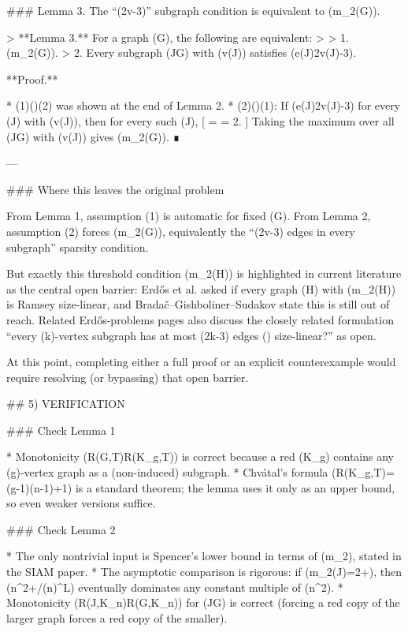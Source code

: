 ### Lemma 3. The “(2v-3)” subgraph condition is equivalent to (m_2(G)).

> **Lemma 3.** For a graph (G), the following are equivalent:
>
> 1. (m_2(G)).
> 2. Every subgraph (J\subseteq G) with (v(J)) satisfies (e(J)\le 2v(J)-3).

**Proof.**

* (1)(\Rightarrow)(2) was shown at the end of Lemma 2.
* (2)(\Rightarrow)(1): If (e(J)\le 2v(J)-3) for every (J) with (v(J)), then for every such (J),
  [
  \le {}
  =  = 2.
  ]
  Taking the maximum over all (J\subseteq G) with (v(J)) gives (m_2(G)).
  ∎

---

### Where this leaves the original problem

From Lemma 1, assumption (1) is automatic for fixed (G).
From Lemma 2, assumption (2) forces (m_2(G)), equivalently the “(2v-3) edges in every subgraph” sparsity condition.

But exactly this threshold condition (m_2(H)) is highlighted in current literature as the central open barrier: Erdős et al. asked if every graph (H) with (m_2(H)) is Ramsey size-linear, and Bradač–Gishboliner–Sudakov state this is still out of reach.
Related Erdős-problems pages also discuss the closely related formulation “every (k)-vertex subgraph has at most (2k-3) edges (\Rightarrow) size-linear?” as open.

At this point, completing either a full proof or an explicit counterexample would require resolving (or bypassing) that open barrier.

## 5) VERIFICATION

### Check Lemma 1

* Monotonicity (R(G,T)\le R(K_g,T)) is correct because a red (K_g) contains any (g)-vertex graph as a (non-induced) subgraph.
* Chvátal’s formula (R(K_g,T)=(g-1)(n-1)+1) is a standard theorem; the lemma uses it only as an upper bound, so even weaker versions suffice.

### Check Lemma 2

* The only nontrivial input is Spencer’s lower bound in terms of (m_2), stated in the SIAM paper.
* The asymptotic comparison is rigorous: if (m_2(J)=2+\varepsilon), then (n^{2+\varepsilon}/(\log n)^L) eventually dominates any constant multiple of (n^2).
* Monotonicity (R(J,K_n)\le R(G,K_n)) for (J\subseteq G) is correct (forcing a red copy of the larger graph forces a red copy of the smaller).

